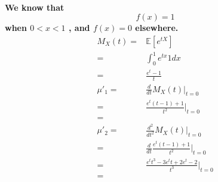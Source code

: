 \documentclass{article}
\begin{document}
        \paragraph{
            We know that
            $$f(x)=1$$ 
            when $0<x<1$
            , and $f(x)=0$ elsewhere.
            \begin{equation*}
                \begin{split}
                    M_X(t)=&\mathbb{E}[e^{tX}]\\
                        =&\int_0^1 e^{tx} 1 dx\\
                        =&\frac{e^t-1}{t}\\
                    \mu'_1=&\frac{d}{dt}M_X(t)|_{t=0}\\
                        =&\frac{e^t(t-1)+1}{t^2}|_{t=0}\\
                        =&\\
                    \mu'_2=&\frac{d^2}{dt^2}M_X(t)|_{t=0}\\    
                        =&\frac{d}{dt}\frac{e^t(t-1)+1}{t^2}|_{t=0}\\
                        =&\frac{e^tt^3-3e^tt+2e^t-2}{t^3}|_{t=0}\\
                        =&\\
                \end{split}
            \end{equation*}
        }
    
    \section{}
\end{document}
